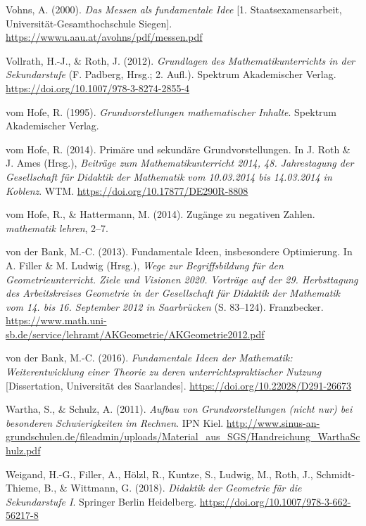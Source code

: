 \documentclass[
]{scrbook}
\newlength{\cslhangindent}
\newenvironment{CSLReferences}[2] %
 {\begin{list}{}{%
  \setlength{\itemindent}{0pt}
  \setlength{\leftmargin}{0pt}
  \setlength{\parsep}{0pt}
  \ifodd #1
   \setlength{\leftmargin}{\cslhangindent}
   \setlength{\itemindent}{-1\cslhangindent}
  \fi
  \setlength{\itemsep}{#2\baselineskip}}}
 {\end{list}}
\theoremstyle{definition}
\theoremstyle{definition}
\theoremstyle{definition}
\theoremstyle{definition}
\theoremstyle{remark}
\begin{document}
\begin{CSLReferences}{1}{0}
Vohns, A. (2000). \emph{Das {Messen} als fundamentale {Idee}} {[}1. Staatsexamensarbeit, Universität-Gesamthochschule Siegen{]}. \url{https://wwwu.aau.at/avohns/pdf/messen.pdf}

Vollrath, H.-J., \& Roth, J. (2012). \emph{Grundlagen des {Mathematikunterrichts} in der {Sekundarstufe}} (F. Padberg, Hrsg.; 2. Aufl.). Spektrum Akademischer Verlag. \url{https://doi.org/10.1007/978-3-8274-2855-4}

vom Hofe, R. (1995). \emph{Grundvorstellungen mathematischer {Inhalte}}. Spektrum Akademischer Verlag.

vom Hofe, R. (2014). Primäre und sekundäre {Grundvorstellungen}. In J. Roth \& J. Ames (Hrsg.), \emph{Beiträge zum {Mathematikunterricht} 2014, 48. {Jahrestagung} der {Gesellschaft} für {Didaktik} der {Mathematik} vom 10.03.2014 bis 14.03.2014 in {Koblenz}}. WTM. \url{https://doi.org/10.17877/DE290R-8808}

vom Hofe, R., \& Hattermann, M. (2014). Zugänge zu negativen {Zahlen}. \emph{mathematik lehren}, 2--7.

von der Bank, M.-C. (2013). Fundamentale {Ideen}, insbesondere {Optimierung}. In A. Filler \& M. Ludwig (Hrsg.), \emph{Wege zur {Begriffsbildung} für den {Geometrieunterricht}. {Ziele} und {Visionen} 2020. {Vorträge} auf der 29. {Herbsttagung} des {Arbeitskreises} {Geometrie} in der {Gesellschaft} für {Didaktik} der {Mathematik} vom 14. bis 16. {September} 2012 in {Saarbrücken}} (S. 83--124). Franzbecker. \url{https://www.math.uni-sb.de/service/lehramt/AKGeometrie/AKGeometrie2012.pdf}

von der Bank, M.-C. (2016). \emph{Fundamentale {Ideen} der {Mathematik}: {Weiterentwicklung} einer {Theorie} zu deren unterrichtspraktischer {Nutzung}} {[}Dissertation, Universität des Saarlandes{]}. \url{https://doi.org/10.22028/D291-26673}

Wartha, S., \& Schulz, A. (2011). \emph{Aufbau von {Grundvorstellungen} (nicht nur) bei besonderen {Schwierigkeiten} im {Rechnen}}. IPN Kiel. \url{http://www.sinus-an-grundschulen.de/fileadmin/uploads/Material_aus_SGS/Handreichung_WarthaSchulz.pdf}

Weigand, H.-G., Filler, A., Hölzl, R., Kuntze, S., Ludwig, M., Roth, J., Schmidt-Thieme, B., \& Wittmann, G. (2018). \emph{Didaktik der {Geometrie} für die {Sekundarstufe} {I}}. Springer Berlin Heidelberg. \url{https://doi.org/10.1007/978-3-662-56217-8}


\end{CSLReferences}
\end{document}
